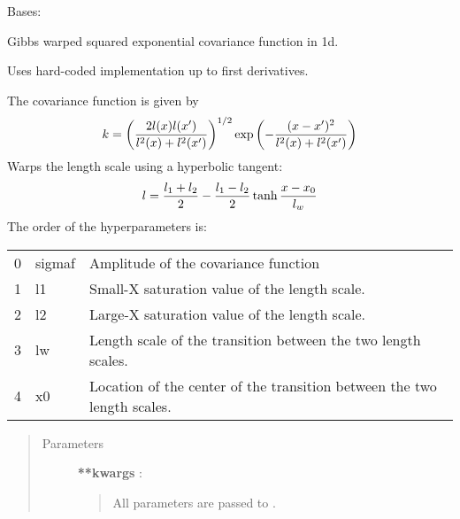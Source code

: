 \documentclass[letterpaper,10pt,english]{sphinxmanual}
\begin{document}

\begin{fulllineitems}
\label{gptools.kernel:gptools.kernel.gibbs.GibbsKernel1dTanh}
Bases: {\hyperref[gptools.kernel:gptools.kernel.gibbs.GibbsKernel1d]{}}

Gibbs warped squared exponential covariance function in 1d.

Uses hard-coded implementation up to first derivatives.

The covariance function is given by
\begin{gather}
\begin{split}k = \left ( \frac{2l(x)l(x')}{l^2(x)+l^2(x')} \right )^{1/2}\exp\left ( -\frac{(x-x')^2}{l^2(x)+l^2(x')} \right )\end{split}\notag
\end{gather}
Warps the length scale using a hyperbolic tangent:
\begin{gather}
\begin{split}l = \frac{l_1 + l_2}{2} - \frac{l_1 - l_2}{2}\tanh\frac{x-x_0}{l_w}\end{split}\notag
\end{gather}
The order of the hyperparameters is:

\begin{tabulary}{\linewidth}{|L|L|L|}
\hline

0
 & 
sigmaf
 & 
Amplitude of the covariance function
\\

1
 & 
l1
 & 
Small-X saturation value of the length scale.
\\

2
 & 
l2
 & 
Large-X saturation value of the length scale.
\\

3
 & 
lw
 & 
Length scale of the transition between the two length scales.
\\

4
 & 
x0
 & 
Location of the center of the transition between the two length scales.
\\
\hline\end{tabulary}

\begin{quote}\begin{description}
\item[{Parameters}] \leavevmode
\textbf{**kwargs} :
\begin{quote}

All parameters are passed to {\hyperref[gptools.kernel:gptools.kernel.core.Kernel]{}}.
\end{quote}

\end{description}\end{quote}

\end{fulllineitems}
\end{document}
